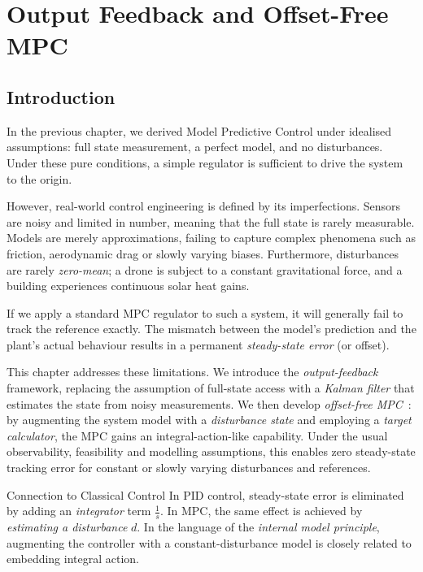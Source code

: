 \chapter{Output Feedback and Offset-Free MPC}
\label{chap:output_fb_mpc}

\section{Introduction}
In the previous chapter, we derived Model Predictive Control under idealised assumptions: full state measurement, a perfect model, and no disturbances. Under these pure conditions, a simple regulator is sufficient to drive the system to the origin.

However, real-world control engineering is defined by its imperfections. Sensors are noisy and limited in number, meaning that the full state is rarely measurable. Models are merely approximations, failing to capture complex phenomena such as friction, aerodynamic drag or slowly varying biases. Furthermore, disturbances are rarely \emph{zero-mean}; a drone is subject to a constant gravitational force, and a building experiences continuous solar heat gains.

If we apply a standard MPC regulator to such a system, it will generally fail to track the reference exactly. The mismatch between the model's prediction and the plant's actual behaviour results in a permanent \emph{steady-state error} (or offset).

This chapter addresses these limitations. We introduce the \emph{output-feedback} framework, replacing the assumption of full-state access with a \emph{Kalman filter} that estimates the state from noisy measurements. We then develop \emph{offset-free MPC}~\cite{Pannocchia2003}: by augmenting the system model with a \textit{disturbance state} and employing a \textit{target calculator}, the MPC gains an integral-action-like capability. Under the usual observability, feasibility and modelling assumptions, this enables zero steady-state tracking error for constant or slowly varying disturbances and references.

\begin{notebox}{Connection to Classical Control}
	In PID control, steady-state error is eliminated by adding an \emph{integrator} term \(\frac{1}{s}\). In MPC, the same effect is achieved by \emph{estimating a disturbance} \(d\). In the language of the \textit{internal model principle}, augmenting the controller with a constant-disturbance model is closely related to embedding integral action.
\end{notebox}

